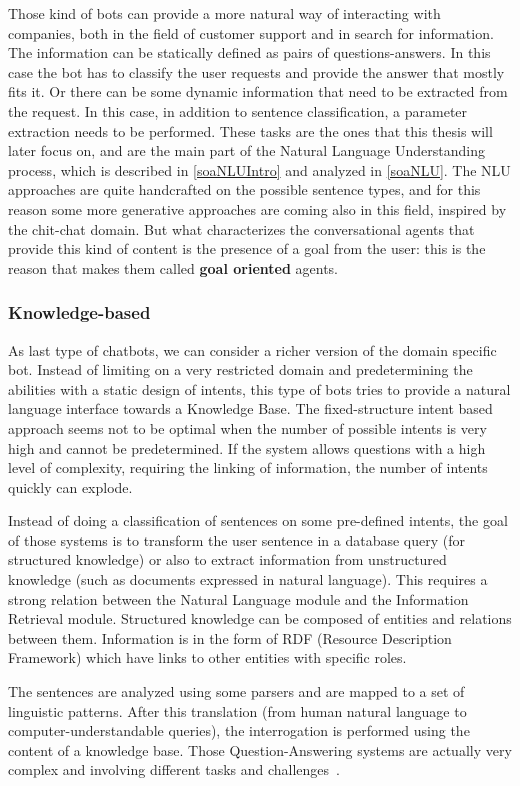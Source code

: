 Those kind of bots can provide a more natural way of interacting with companies, both in the field of customer support and in search for information. The information can be statically defined as pairs of questions-answers. In this case the bot has to classify the user requests and provide the answer that mostly fits it. Or there can be some dynamic information that need to be extracted from the request. In this case, in addition to sentence classification, a parameter extraction needs to be performed. These tasks are the ones that this thesis will later focus on, and are the main part of the Natural Language Understanding process, which is described in \ref{soaNLUIntro} and analyzed in \ref{soaNLU}. The NLU approaches are quite handcrafted on the possible sentence types, and for this reason some more generative approaches are coming also in this field, inspired by the chit-chat domain. But what characterizes the conversational agents that provide this kind of content is the presence of a goal from the user: this is the reason that makes them called \textbf{goal oriented} agents.

\subsubsection{Knowledge-based}
As last type of chatbots, we can consider a richer version of the domain specific bot. Instead of limiting on a very restricted domain and predetermining the abilities with a static design of intents, this type of bots tries to provide a natural language interface towards a Knowledge Base. The fixed-structure intent based approach seems not to be optimal when the number of possible intents is very high and cannot be predetermined. If the system allows questions with a high level of complexity, requiring the linking of information, the number of intents quickly can explode.

Instead of doing a classification of sentences on some pre-defined intents, the goal of those systems is to transform the user sentence in a database query (for structured knowledge) or also to extract information from unstructured knowledge (such as documents expressed in natural language). This requires a strong relation between the Natural Language module and the Information Retrieval module. Structured knowledge can be composed of entities and relations between them. Information is in the form of RDF (Resource Description Framework) which have links to other entities with specific roles.

The sentences are analyzed using some parsers and are mapped to a set of linguistic patterns. After this translation (from human natural language to computer-understandable queries), the interrogation is performed using the content of a knowledge base. Those Question-Answering systems are actually very complex and involving different tasks and challenges~\cite{hoffner2017survey}.

